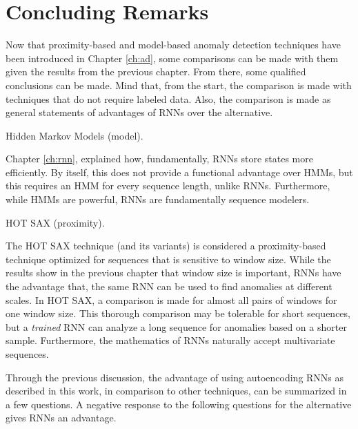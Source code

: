 \chapter{Concluding Remarks}

Now that proximity-based and model-based anomaly detection techniques have been introduced in Chapter \ref{ch:ad}, some comparisons can be made with them given the results from the previous chapter.
%
From there, some qualified conclusions can be made.
%
Mind that, from the start, the comparison is made with techniques that do not require labeled data.
%
Also, the comparison is made as general statements of advantages of RNNs over the alternative.

\begin{description}


\item Hidden Markov Models (model).

      Chapter \ref{ch:rnn}, explained how, fundamentally, RNNs store states more efficiently.
      By itself, this does not provide a functional advantage over HMMs, but this requires an HMM for every sequence length, unlike RNNs.
      Furthermore, while HMMs are powerful, RNNs are fundamentally sequence modelers.


\item HOT SAX (proximity).

      The HOT SAX \cite{Keogh2005} technique (and its variants) is considered a proximity-based technique optimized for sequences that is sensitive to window size.
      While the results show in the previous chapter that window size is important, RNNs have the advantage that, the same RNN can be used to find anomalies at different scales.
      In HOT SAX, a comparison is made for almost all pairs of windows for one window size.
      This thorough comparison may be tolerable for short sequences, but a \emph{trained} RNN can analyze a long sequence for anomalies based on a shorter sample.
      Furthermore, the mathematics of RNNs naturally accept multivariate sequences.


\end{description}


Through the previous discussion, the advantage of using autoencoding RNNs as described in this work, in comparison to other techniques, can be summarized in a few questions.
%
A negative response to the following questions for the alternative gives RNNs an advantage.


